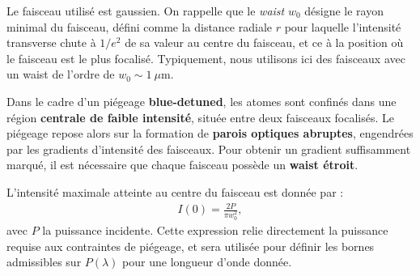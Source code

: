 Le faisceau utilisé est gaussien. On rappelle que le \textit{waist} $w_0$ désigne le rayon minimal du faisceau, défini comme la distance radiale $r$ pour laquelle l’intensité transverse chute à $1/e^2$ de sa valeur au centre du faisceau, et ce à la position où le faisceau est le plus focalisé. Typiquement, nous utilisons ici des faisceaux avec un waist de l’ordre de $w_0 \sim 1~\mu\text{m}$.  

\medskip

Dans le cadre d’un piégeage \textbf{blue-detuned}, les atomes sont confinés dans une région \textbf{centrale de faible intensité}, située entre deux faisceaux focalisés. Le piégeage repose alors sur la formation de \textbf{parois optiques abruptes}, engendrées par les gradients d’intensité des faisceaux. Pour obtenir un gradient suffisamment marqué, il est nécessaire que chaque faisceau possède un \textbf{waist étroit}.


%

L’intensité maximale atteinte au centre du faisceau est donnée par :
\begin{eqnarray}
	I(0) = \frac{2P}{\pi w_0^2},
\end{eqnarray}
avec $P$ la puissance incidente. Cette expression relie directement la puissance requise aux contraintes de piégeage, et sera utilisée pour définir les bornes admissibles sur $P(\lambda)$ pour une longueur d’onde donnée.

